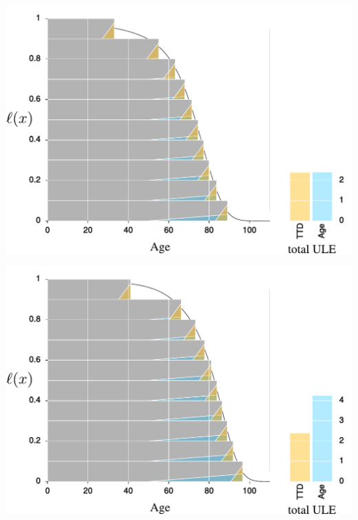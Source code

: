 \documentclass[20pt]{beamer}
\begin{document}


\begin{frame}[plain]
\begin{center}
 \includegraphics[width=\linewidth]{Figures/Japan1970.pdf}
\end{center}
\end{frame}


\begin{frame}[plain]
\begin{center}
 \includegraphics[width=\linewidth]{Figures/Japan2010.pdf}
\end{center}
\end{frame}
\end{document}

